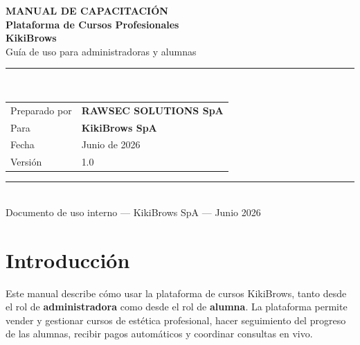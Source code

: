 \documentclass[a4paper,11pt]{article}
\begin{document}
\thispagestyle{empty}
\vspace*{18mm}

\begin{center}
  {\small\bfseries\color{gold}MANUAL DE CAPACITACI\'ON}\\[14pt]
  {\LARGE\bfseries\color{mainblack}
    Plataforma de Cursos Profesionales\\[6pt]KikiBrows}\\[12pt]
  {\large\color{midgray}Gu\'ia de uso para administradoras y alumnas}\\[28pt]
  {\color{bordergray}\rule{0.45\linewidth}{0.4pt}}\\[22pt]
\end{center}

\begin{center}
\renewcommand{\arraystretch}{1.4}
\begin{tabular}{@{}ll@{}}
  \textcolor{midgray}{\small Preparado por}   & \textbf{RAWSEC SOLUTIONS SpA} \\
  \textcolor{midgray}{\small Para}             & \textbf{KikiBrows SpA} \\[4pt]
  \textcolor{midgray}{\small Fecha}            & Junio de 2026 \\
  \textcolor{midgray}{\small Versi\'on}        & 1.0 \\
\end{tabular}
\end{center}

\vfill
\begin{center}
  {\color{bordergray}\rule{\linewidth}{0.3pt}}\\[5pt]
  {\small\color{midgray}
    Documento de uso interno --- KikiBrows SpA --- Junio 2026}
\end{center}
\newpage

\tableofcontents
\newpage

\section{Introducci\'on}

Este manual describe c\'omo usar la plataforma de cursos KikiBrows, tanto desde el
rol de \textbf{administradora} como desde el rol de \textbf{alumna}. La plataforma
permite vender y gestionar cursos de est\'etica profesional, hacer seguimiento del
progreso de las alumnas, recibir pagos autom\'aticos y coordinar consultas en vivo.
\end{document}
